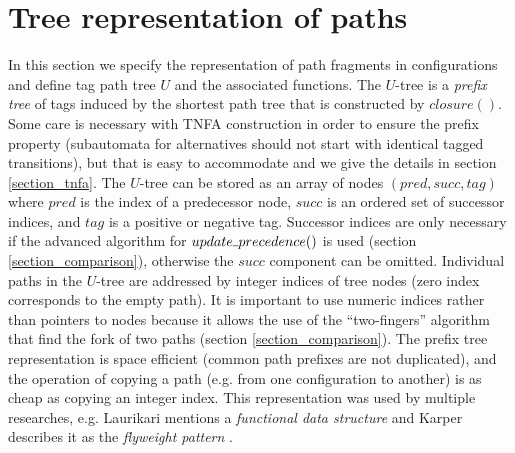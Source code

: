 \documentclass[AMA,STIX1COL]{WileyNJD-v2}
\newcommand{\Xund}{\rule{.4em}{.4pt}}
\begin{document}
\section{Tree representation of paths}\label{section_pathtree}

In this section we specify the representation of path fragments in configurations
and define tag path tree $U$ and the associated functions.
The $U$-tree is a \emph{prefix tree} of tags induced by the shortest path tree that is constructed by $closure()$.
Some care is necessary with TNFA construction in order to ensure the prefix property
(subautomata for alternatives should not start with identical tagged transitions),
but that is easy to accommodate and we give the details in section \ref{section_tnfa}.
The $U$-tree can be stored as an array of nodes $(pred, succ, tag)$ where
$pred$ is the index of a predecessor node,
$succ$ is an ordered set of successor indices,
and $tag$ is a positive or negative tag.
%
Successor indices are only necessary if the advanced algorithm for $update \Xund precedence ()$ is used
(section \ref{section_comparison}), otherwise the $succ$ component can be omitted.
%
Individual paths in the $U$-tree are addressed by integer indices of tree nodes
(zero index corresponds to the empty path).
%
It is important to use numeric indices rather than pointers to nodes
because it allows the use of the ``two-fingers'' algorithm that find the fork of two paths (section \ref{section_comparison}).
%
The prefix tree representation is space efficient (common path prefixes are not duplicated),
and the operation of copying a path (e.g. from one configuration to another) is as cheap as copying an integer index.
This representation was used by multiple researches,
e.g. Laurikari mentions a \emph{functional data structure} \cite{Lau01}
and Karper describes it as the \emph{flyweight pattern} \cite{Kar14}.
\\
\end{document}
